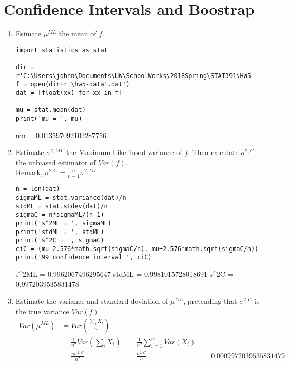 \documentclass[preprint,12pt]{elsarticle}
\begin{document}
    \section{Confidence Intervals and Boostrap}
    \begin{enumerate}[label=\alph*]
        \item Esimate $\mu^{ML}$ the mean of $f$.
        \begin{lstlisting}
import statistics as stat

dir = r'C:\Users\johnn\Documents\UW\SchoolWorks\2018Spring\STAT391\HW5'
f = open(dir+r'\hw5-data1.dat')
dat = [float(xx) for xx in f]

mu = stat.mean(dat)
print('mu = ', mu)
        \end{lstlisting}
        \begin{spverbatim}
mu =  0.013597092102287756            
        \end{spverbatim}

        \item Estimate $\sigma^{2,ML}$ the Maximum Likelihood variance of $f$.
        Then calculate $\sigma^{2,C}$ the unbiased estimator of $Var(f)$.\\
        
        Remark, $\sigma^{2,C} = \frac{n}{n-1}\sigma^{2,ML}$.
        \begin{lstlisting}
n = len(dat)
sigmaML = stat.variance(dat)/n
stdML = stat.stdev(dat)/n
sigmaC = n*sigmaML/(n-1)
print('s^2ML = ', sigmaML)
print('stdML = ', stdML)
print('s^2C = ', sigmaC)
ciC = (mu-2.576*math.sqrt(sigmaC/n), mu+2.576*math.sqrt(sigmaC/n))
print('99 confidence interval ', ciC)
        \end{lstlisting}
        \begin{spverbatim}
s^2ML =  0.9962067496295647
stdML =  0.9981015728018691
s^2C =  0.9972039535831478            
        \end{spverbatim}
        
        \item Estimate the variance and standard deviation of $\mu^{ML}$,
        pretending that $\sigma^{2,C}$ is the true variance $Var(f)$.
        \begin{align*}
            Var(\mu^{ML}) &= Var(\frac{\sum_{i}X_i}{n})\\
            &= \frac{1}{n^2}Var(\sum_{i}X_i)
            &= \frac{1}{n^2}\sum_{i=1}^{n}Var(X_i)\\
            &= \frac{n\sigma^{2,C}}{n^2}
            &=\frac{\sigma^{2,C}}{n}
            &= 0.0009972039535831479
        \end{align*}


\end{enumerate}
\end{document}
